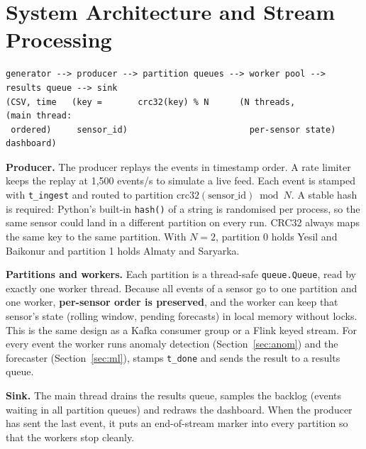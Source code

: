 \documentclass[11pt]{article}
\begin{document}
\section{System Architecture and Stream Processing}
\label{sec:arch}
{\footnotesize
\begin{verbatim}
generator --> producer --> partition queues --> worker pool --> results queue --> sink
(CSV, time   (key =       crc32(key) % N      (N threads,                     (main thread:
 ordered)     sensor_id)                        per-sensor state)              dashboard)
\end{verbatim}
}

\textbf{Producer.} The producer replays the events in timestamp order. A rate limiter keeps the replay at 1{,}500 events/s to simulate a live feed. Each event is stamped with \texttt{t\_ingest} and routed to partition $\text{crc32}(\text{sensor\_id}) \bmod N$. A stable hash is required: Python's built-in \texttt{hash()} of a string is randomised per process, so the same sensor could land in a different partition on every run. CRC32 always maps the same key to the same partition. With $N=2$, partition 0 holds Yesil and Baikonur and partition 1 holds Almaty and Saryarka.

\textbf{Partitions and workers.} Each partition is a thread-safe \texttt{queue.Queue}, read by exactly one worker thread. Because all events of a sensor go to one partition and one worker, \textbf{per-sensor order is preserved}, and the worker can keep that sensor's state (rolling window, pending forecasts) in local memory without locks. This is the same design as a Kafka consumer group or a Flink keyed stream. For every event the worker runs anomaly detection (Section~\ref{sec:anom}) and the forecaster (Section~\ref{sec:ml}), stamps \texttt{t\_done} and sends the result to a results queue.

\textbf{Sink.} The main thread drains the results queue, samples the backlog (events waiting in all partition queues) and redraws the dashboard. When the producer has sent the last event, it puts an end-of-stream marker into every partition so that the workers stop cleanly.
\end{document}

